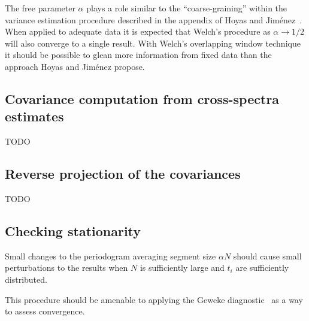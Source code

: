 \documentclass[letterpaper,11pt,nointlimits,reqno]{amsart}
\begin{document}
The free parameter $\alpha$ plays a role similar to the ``coarse-graining''
within the variance estimation procedure described in the appendix of Hoyas and
Jim\'{e}nez~\cite{Hoyas2008Reynolds}.  When applied to adequate data it is
expected that Welch's procedure as $\alpha\to{}1/2$ will also converge to a
single result.  With Welch's overlapping window technique it should be possible
to glean more information from fixed data than the approach Hoyas and
Jim\'{e}nez propose.

\subsection*{Covariance computation from cross-spectra estimates}

TODO

\subsection*{Reverse projection of the covariances}

TODO

\subsection*{Checking stationarity}

Small changes to the periodogram averaging segment size $\alpha N$
should cause small perturbations to the results when $N$ is sufficiently
large and $t_i$ are sufficiently distributed.

This procedure should be amenable to applying the Geweke
diagnostic~\cite{Geweke1992Evaluating} as a way to assess convergence.




\end{document}
